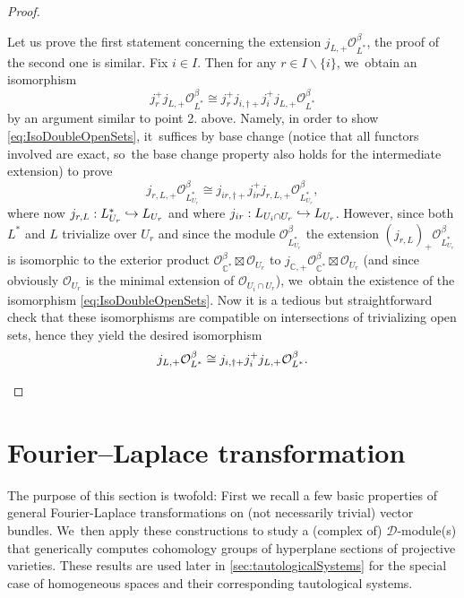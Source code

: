 \documentclass[JEP,XML,SOM,Unicode,published]{cedram}
\let\mathds\mathbb
\newcommand\hto{\mathrel{\lhook\joinrel\to}}
\newcommand{\dC}{{\mathds C}}\let\C\dC
\newcommand{\cO}{\mathcal{O}}\let\O\cO
\begin{document}
\begin{proof}
\begin{enumerate}
Let us prove the first statement concerning the extension $j_{L,+}\cO_{L^*}^\beta$, the proof of the second one is similar. Fix $i\in I$. Then for any $r\in I\backslash\{i\}$, we~obtain an isomorphism
\begin{equation}\label{eq:IsoDoubleOpenSets}
j_r^+ j_{L,+} \cO^\beta_{L^{*}} \cong j_r^+ j_{i,\dag+} j_i^+ j_{L,+} \cO^\beta_{L^{*}}
\end{equation}
by an argument similar to point 2. above. Namely, in order to show \eqref{eq:IsoDoubleOpenSets}, it~suffices by base change (notice that all functors involved are exact, so~the base change property also holds for the intermediate extension) to prove
\[
j_{r,L,+} \cO_{L^*_{U_r}}^\beta \cong
j_{ir,\dag+}
j_{ir}^+
j_{r,L,+} \cO^\beta_{L_{U_r}^{*}},
\]
where now $j_{r,L}:L^*_{U_r}\hto L_{U_r}$ and where
$j_{ir}:L_{U_i\cap U_r}\hto L_{U_r}$. However, since both $L^*$ and $L$ trivialize over $U_r$ and since the module $\cO_{L_{U_r}^*}^\beta$ \resp the extension $(j_{r,L})_+\cO_{L_{U_r}^*}^\beta$ is isomorphic to the exterior product $\cO_{\dC^*}^\beta\boxtimes \cO_{U_r}$ \resp to $j_{\dC,+}\cO_{\dC^*}^\beta\boxtimes \cO_{U_r}$ (and since obviously
$\cO_{U_r}$ is the minimal extension of $\cO_{U_i\cap U_r}$), we~obtain the existence of the isomorphism \eqref{eq:IsoDoubleOpenSets}. Now it is a tedious but straightforward check that these isomorphisms are compatible on intersections of trivializing open sets, hence they yield the desired isomorphism
\[
j_{L,+} \cO^\beta_{L^{*}} \cong j_{i,\dag+} j_i^+ j_{L,+} \cO^\beta_{L^{*}}.\qedhere
\]
\end{enumerate}
\end{proof}

\section{Fourier--Laplace transformation} \label{sec:FLOnVecBundles}

The purpose of this section is twofold: First we recall a few basic properties of general Fourier-Laplace transformations on (not necessarily trivial) vector bundles. We~then apply these constructions to study a (complex of) $\mathscr{D}$\nobreakdash-mod\-ule(s) that generically computes cohomology groups of hyperplane sections of projective varieties. These results are used later in \cref{sec:tautologicalSystems} for the special case of
homogeneous spaces and their corresponding tautological systems.

 \label{ssec:FLBasics}
\end{document}
